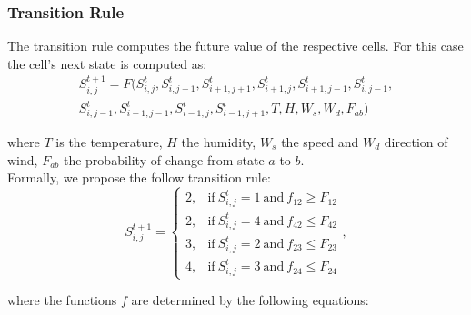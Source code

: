 \documentclass[conference]{IEEEtran}
\begin{document}
        
        \subsubsection{Transition Rule}
        
            The transition rule computes the future value of the respective cells. For this case
            the cell’s next state is computed as: 
            \begin{equation}
                \begin{split}
                    S_{i,j}^{t+1} = F(S_{i,j}^t,S_{i,j+1}^t, S_{i+1,j+1}^t,S_{i+1,j}^t, S_{i+1,j-1}^t, S_{i,j-1}^t, \\ \nonumber
                    S_{i,j-1}^t, S_{i-1,j-1}^t, S_{i-1,j}^t, S_{i-1,j+1}^t, T, H, W_s, W_d, F_{ab})
                \end{split}
                \label{eq:transition_rule}
            \end{equation}
            
            where $T$ is the temperature, $H$ the humidity, $W_s$ the speed and $W_d$ direction of wind, $F_{ab}$ the 
            probability of change from state $a$ to $b$. \\
            
            Formally, we propose the follow transition rule:
            \begin{equation}
                S_{i,j}^{t+1} =
                \begin{cases}
                    2, & \text{if} ~ S_{i,j}^{t} = 1 ~ \text{and} ~ f_{12} \geq F_{12} \\
                    2, & \text{if} ~ S_{i,j}^{t} = 4 ~ \text{and} ~ f_{42} \leq F_{42} \\
                    3, & \text{if} ~ S_{i,j}^{t} = 2 ~ \text{and} ~ f_{23} \leq F_{23} \\
                    4, & \text{if} ~ S_{i,j}^{t} = 3 ~ \text{and} ~ f_{24} \leq F_{24}
                \end{cases},
            \end{equation}
            
            where the functions $f$ are determined by the following equations:
            
\end{document}
